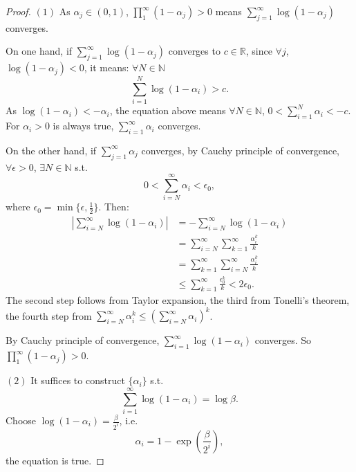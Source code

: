 \documentclass{article}
\newcommand{\sm}[2]{\sum_{#1=1}^{#2}}
\begin{document}
\begin{proof}
    $(1)$ As $\alpha_{j}\in(0,1)$, $\prod_{1}^{\infty}(1-\alpha_{j})>0$ 
    means $\sm{j}{\infty}\log(1-\alpha_{j})$ converges. 
    
    On one hand, 
    if $\sm{j}{\infty}\log(1-\alpha_{j})$ converges to $c\in\mathbb{R}$, 
    since $\forall j$, $\log(1-\alpha_{j})<0$, it means: 
    $\forall N\in\mathbb{N}$
    \begin{displaymath}
        \sum_{i=1}^{N}\log(1-\alpha_{i})>c.
    \end{displaymath}
    As $\log(1-\alpha_{i})<-\alpha_{i}$, the equation above means 
    $\forall N\in\mathbb{N}$, $0<\sm{i}{N}\alpha_{i}<-c$. 
    For $\alpha_{i}>0$ is always true, 
    $\sm{i}{\infty}\alpha_{i}$ converges.

    On the other hand, if $\sm{j}{\infty}\alpha_{j}$ converges, 
    by Cauchy principle of convergence, $\forall\epsilon>0$, 
    $\exists N\in\mathbb{N}$ s.t. 
    \begin{displaymath}
        0<\sum_{i=N}^{\infty}\alpha_{i}<\epsilon_{0},
    \end{displaymath}
    where $\epsilon_{0}=\min\{\epsilon,\frac{1}{2}\}$. 
    Then:
    \begin{displaymath}
        \begin{array}{rl}
        |\sum_{i=N}^{\infty}\log(1-\alpha_{i})|&=
        -\sum_{i=N}^{\infty}\log(1-\alpha_{i})\\
        &=\sum_{i=N}^{\infty}\sum_{k=1}^{\infty}\frac{\alpha_{i}^{k}}{k}\\
        &=\sum_{k=1}^{\infty}\sum_{i=N}^{\infty}\frac{\alpha_{i}^{k}}{k}\\
        &\le\sm{k}{\infty}\frac{\epsilon_{0}^{k}}{k}
        <2\epsilon_{0}.
        \end{array}
    \end{displaymath}
    The second step follows from Taylor expansion, 
    the third from Tonelli's theorem, 
    the fourth step from 
    $\sum_{i=N}^{\infty}\alpha_{i}^{k}\le
    (\sum_{i=N}^{\infty}\alpha_{i})^{k}$.

    By Cauchy principle of convergence, 
    $\sum_{i=1}^{\infty}\log(1-\alpha_{i})$ converges. 
    So $\prod_{1}^{\infty}(1-\alpha_{j})>0$.

    $(2)$ It suffices to construct $\{\alpha_{i}\}$ s.t. 
    \begin{displaymath}
        \sm{i}{\infty}\log(1-\alpha_{i})=\log\beta.
    \end{displaymath}
    Choose $\log(1-\alpha_{i})=\frac{\beta}{2^{i}}$, i.e. 
    \begin{displaymath}
        \alpha_{i}=1-\exp(\frac{\beta}{2^{i}}),
    \end{displaymath}
    the equation is true.
\end{proof}
\end{document}
